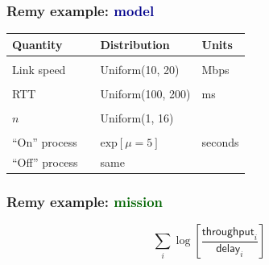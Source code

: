 \documentclass[svgnames]{beamer}
\begin{document}
\begin{frame}
\frametitle{Remy example: \textbf{\textcolor{DarkBlue}{model}}}

\large

\begin{tabular}{llll}
\bf Quantity & & \bf Distribution & \bf Units \\

\hline \\

Link speed & & Uniform(10, 20) & Mbps \\

\\

RTT & & Uniform(100, 200) & ms \\

\\

$n$ & & Uniform(1, 16) \\

\\

``On'' process & & $\mathrm{exp}[\mu = 5]$ & seconds \\

``Off'' process & & same \\

\end{tabular}

\end{frame}

\begin{frame}
\frametitle{Remy example: \textbf{\textcolor{DarkGreen}{mission}}}

\LARGE

\[\sum_i \log \left[ \frac{\textsf{throughput}_i}{\textsf{delay}_i} \right]\]

\end{frame}


\end{document}
